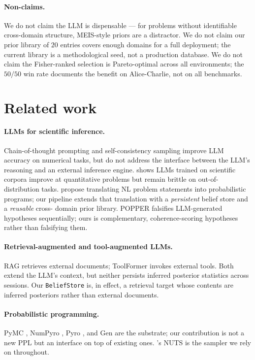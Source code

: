 \documentclass{article}
\begin{document}
\paragraph{Non-claims.} We do not claim the LLM is dispensable ---
for problems without identifiable cross-domain structure, MEIS-style
priors are a distractor. We do not claim our prior library of $20$
entries covers enough domains for a full deployment; the current
library is a methodological seed, not a production database. We do
not claim the Fisher-ranked selection is Pareto-optimal across all
environments; the $50 / 50$ win rate documents the benefit on
Alice-Charlie, not on all benchmarks.

\section{Related work}
\label{sec:related}

\paragraph{LLMs for scientific inference.} Chain-of-thought prompting
\citep{wei2022chain} and self-consistency sampling
\citep{wang2023selfcons} improve LLM accuracy on numerical tasks,
but do not address the interface between the LLM's reasoning and an
external inference engine. \citet{lewkowycz2022minerva} shows LLMs
trained on scientific corpora improve at quantitative problems but
remain brittle on out-of-distribution tasks.
\citet{wong2023wordmodels} propose translating NL problem statements
into probabilistic programs; our pipeline extends that translation
with a \emph{persistent} belief store and a \emph{reusable} cross-
domain prior library. POPPER \citep{huang2025popperllm} falsifies
LLM-generated hypotheses sequentially; ours is complementary,
coherence-scoring hypotheses rather than falsifying them.

\paragraph{Retrieval-augmented and tool-augmented LLMs.}
RAG \citep{lewis2020rag} retrieves external documents;
ToolFormer \citep{schick2024toolformer} invokes external tools. Both
extend the LLM's context, but neither persists inferred posterior
statistics across sessions. Our \texttt{BeliefStore} is, in effect,
a retrieval target whose contents are inferred posteriors rather
than external documents.

\paragraph{Probabilistic programming.} PyMC \citep{salvatier2016pymc},
NumPyro \citep{phan2019numpyro}, Pyro \citep{bingham2019pyro}, and
Gen \citep{cusumano2019gen} are the substrate; our contribution is
not a new PPL but an interface on top of existing ones.
\citet{hoffman2014nuts}'s NUTS is the sampler we rely on throughout.
\end{document}
